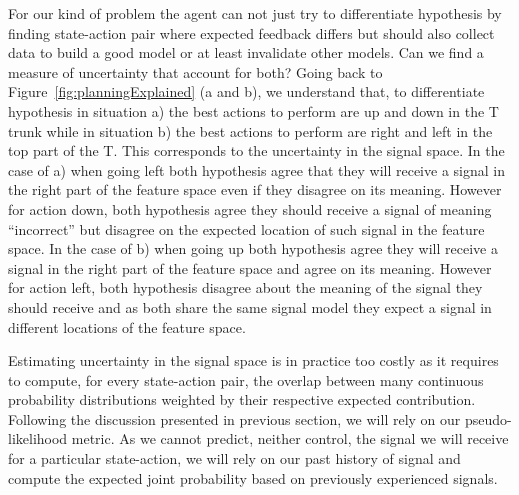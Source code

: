 For our kind of problem the agent can not just try to differentiate hypothesis by finding state-action pair where expected feedback differs but should also collect data to build a good model or at least invalidate other models. Can we find a measure of uncertainty that account for both? Going back to Figure~\ref{fig:planningExplained} (a and b), we understand that, to differentiate hypothesis in situation a) the best actions to perform are up and down in the T trunk while in situation b) the best actions to perform are right and left in the top part of the T. This corresponds to the uncertainty in the signal space. In the case of a) when going left both hypothesis agree that they will receive a signal in the right part of the feature space even if they disagree on its meaning. However for action down, both hypothesis agree they should receive a signal of meaning ``incorrect'' but disagree on the expected location of such signal in the feature space. In the case of b) when going up both hypothesis agree they will receive a signal in the right part of the feature space and agree on its meaning. However for action left, both hypothesis disagree about the meaning of the signal they should receive and as both share the same signal model they expect a signal in different locations of the feature space.

Estimating uncertainty in the signal space is in practice too costly as it requires to compute, for every state-action pair, the overlap between many continuous probability distributions weighted by their respective expected contribution. Following the discussion presented in previous section, we will rely on our pseudo-likelihood metric. As we cannot predict, neither control, the signal we will receive for a particular state-action, we will rely on our past history of signal and compute the expected joint probability based on previously experienced signals.




